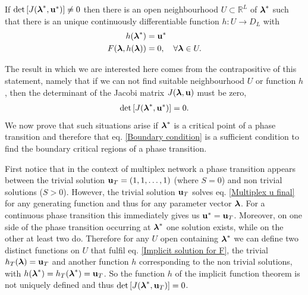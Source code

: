 \documentclass[a4paper]{article}
\begin{document}
If $\det\left[ J(\boldsymbol{\mathrm{\lambda}}^*, \boldsymbol{\mathrm{u}}^*) \right] \neq 0$ then there is an open neighbourhood $U \subset \mathbb{R}^L$ of $\boldsymbol{\mathrm{\lambda}}^*$ such that there is an unique continuously differentiable function $h : U \rightarrow D_L$ with
\begin{align}
	h(\boldsymbol{\mathrm{\lambda}}^*) &= \boldsymbol{\mathrm{u}}^* \\
	F(\boldsymbol{\mathrm{\lambda}}, h(\boldsymbol{\mathrm{\lambda}})) &= 0, \quad \forall \boldsymbol{\mathrm{\lambda}} \in U. \label{Implicit solution for F}
\end{align}

The result in which we are interested here comes from the contrapositive of this statement, namely that if we can not find suitable neighbourhood $U$ or function $h$, then the determinant of the Jacobi matrix $J(\boldsymbol{\mathrm{\lambda}}, \boldsymbol{\mathrm{u}})$ must be zero,
\begin{align}
	\det\left[ J(\boldsymbol{\mathrm{\lambda}}^*, \boldsymbol{\mathrm{u}}^*) \right] = 0 \label{Boundary condition}.
\end{align}
We now prove that such situations arise if $\boldsymbol{\mathrm{\lambda}}^*$ is a critical point of a phase transition and therefore that eq. \eqref{Boundary condition} is a sufficient condition to find the boundary critical regions of a phase transition.

First notice that in the context of multiplex network a phase transition appears between the trivial solution $\boldsymbol{\mathrm{u}}_T = (1, 1, \dots, 1)$ (where $S = 0$) and non trivial solutions ($S > 0$). However, the trivial solution $\boldsymbol{\mathrm{u}}_T$ solves eq. \eqref{Multiplex u final} for any generating function and thus for any parameter vector $\boldsymbol{\mathrm{\lambda}}$. For a continuous phase transition this immediately gives us $\boldsymbol{\mathrm{u}}^* = \boldsymbol{\mathrm{u}}_T$. Moreover, on one side of the phase transition occurring at $\boldsymbol{\mathrm{\lambda}}^*$ one solution exists, while on the other at least two do. Therefore for any $U$ open containing $\boldsymbol{\mathrm{\lambda}}^*$ we can define two distinct functions on $U$ that fulfil eq. \eqref{Implicit solution for F}, the trivial $h_T(\boldsymbol{\mathrm{\lambda}}) = \boldsymbol{\mathrm{u}}_T$ and another function $h$ corresponding to the non trivial solutions, with $h(\boldsymbol{\mathrm{\lambda}}^*) = h_T(\boldsymbol{\mathrm{\lambda}}^*) = \boldsymbol{\mathrm{u}}_T$. So the function $h$ of the implicit function theorem is not uniquely defined and thus $\det\left[ J(\boldsymbol{\mathrm{\lambda}}^*, \boldsymbol{\mathrm{u}}_T) \right] = 0$.
\end{document}
